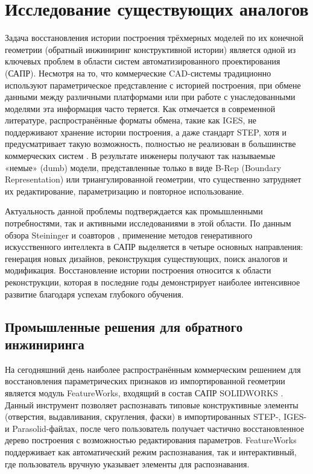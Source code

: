 \section{Исследование существующих аналогов}

Задача восстановления истории построения трёхмерных моделей по их конечной геометрии (обратный инжиниринг конструктивной истории) является одной из ключевых проблем в области систем автоматизированного проектирования (САПР). Несмотря на то, что коммерческие CAD-системы традиционно используют параметрическое представление с историей построения, при обмене данными между различными платформами или при работе с унаследованными моделями эта информация часто теряется. Как отмечается в современной литературе, распространённые форматы обмена, такие как IGES, не поддерживают хранение истории построения, а даже стандарт STEP, хотя и предусматривает такую возможность, полностью не реализован в большинстве коммерческих систем \cite{kim2023reconstruction}. В результате инженеры получают так называемые «немые» (dumb) модели, представленные только в виде B-Rep (Boundary Representation) или триангулированной геометрии, что существенно затрудняет их редактирование, параметризацию и повторное использование.

Актуальность данной проблемы подтверждается как промышленными потребностями, так и активными исследованиями в этой области. По данным обзора Steininger и соавторов \cite{steininger2025enhancing}, применение методов генеративного искусственного интеллекта в САПР выделяется в четыре основных направления: генерация новых дизайнов, реконструкция существующих, поиск аналогов и модификация. Восстановление истории построения относится к области реконструкции, которая в последние годы демонстрирует наиболее интенсивное развитие благодаря успехам глубокого обучения.

\subsection{Промышленные решения для обратного инжиниринга}

На сегодняшний день наиболее распространённым коммерческим решением для восстановления параметрических признаков из импортированной геометрии является модуль FeatureWorks, входящий в состав САПР SOLIDWORKS \cite{solidxperts2025featureworks}. Данный инструмент позволяет распознавать типовые конструктивные элементы (отверстия, выдавливания, скругления, фаски) в импортированных STEP-, IGES- и Parasolid-файлах, после чего пользователь получает частично восстановленное дерево построения с возможностью редактирования параметров. FeatureWorks поддерживает как автоматический режим распознавания, так и интерактивный, где пользователь вручную указывает элементы для распознавания.

